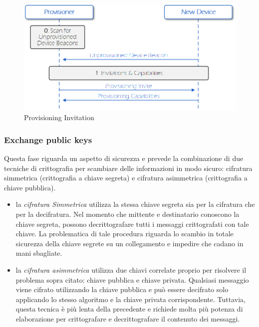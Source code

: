 \begin{figure}[!ht]
    \centering
    \includegraphics[width = \textwidth]{images/Provisioning_Invitation.png}
    \caption{Provisioning Invitation}
    \label{fig:provisioning_invitation}
\end{figure}

\subsubsection{Exchange public keys}
Questa fase riguarda un aspetto di sicurezza e prevede la combinazione di due tecniche di crittografia per scambiare delle informazioni in modo sicuro: cifratura simmetrica (crittografia a chiave segreta) e cifratura asimmetrica (crittografia a chiave pubblica).

\begin{itemize}
    \item la \textit{cifratura Simmetrica} utilizza la stessa chiave segreta sia per la cifratura che per la decifratura. Nel momento che mittente e destinatario conoscono la chiave segreta, possono decrittografare tutti i messaggi crittografati con tale chiave. La problematica di tale procedura riguarda lo scambio in totale sicurezza della chiave segrete su un collegamento e impedire che cadano in mani sbagliate.

    \item la \textit{cifratura asimmetrica} utilizza due chiavi correlate proprio per risolvere il problema sopra citato: chiave pubblica e chiave privata. Qualsiasi messaggio viene cifrato utilizzando la chiave pubblica e può essere decifrato solo applicando lo stesso algoritmo e la chiave privata corrispondente. Tuttavia, questa tecnica è più lenta della precedente e richiede molta più potenza di elaborazione per crittografare e decrittografare il contenuto dei messaggi.
\end{itemize}

